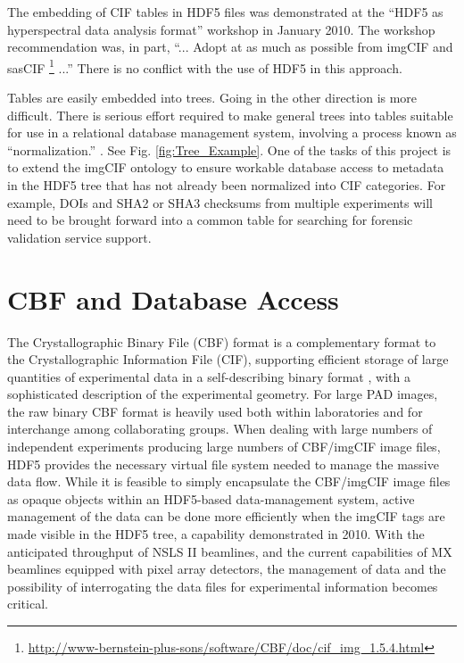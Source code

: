 \documentclass[11pt]{a0poster}
\begin{document}
\begin{minipage}[]{0.29\linewidth}
The embedding of CIF tables in HDF5
files was demonstrated at the  
``HDF5 as hyperspectral data analysis format'' workshop in January 2010. \cite{Gotz2010}  The
workshop recommendation was, in part, ``... Adopt at as much as possible from imgCIF and sasCIF
 \footnote{ \url{http://www-bernstein-plus-sons/software/CBF/doc/cif_img_1.5.4.html}} ...''   There is
 no conflict with the use of HDF5 in this approach.  

\noindent{}Tables are easily embedded into trees.  Going in
the other direction is more difficult.  There
is serious effort required to make general trees into tables suitable for use in a relational
database management system, involving a process known as ``normalization.''  \cite{Codd1972}.
See Fig. \ref{fig:Tree_Example}.
One of the tasks of this project is to extend the imgCIF ontology to ensure workable database
access to metadata in the HDF5 tree that has not already been normalized into CIF categories.
For example, DOIs and SHA2 or SHA3 checksums from multiple experiments will need to be brought
forward into a common table for searching for forensic validation service support.

\section*{CBF and Database Access}%
\fontsize{18}{22}\selectfont %
\noindent{}The Crystallographic Binary File (CBF) format is a complementary format to the Crystallographic 
Information File (CIF), supporting efficient storage of large quantities of experimental data in a 
self-describing binary format \cite{imgCIF}, with a sophisticated
description of the experimental geometry.  For large PAD images, the raw binary CBF format is heavily used both within laboratories and for interchange among collaborating groups.  When dealing with large numbers
of independent experiments producing large numbers of CBF/imgCIF image files, HDF5 provides
the necessary virtual file system needed to manage the massive data flow.  While it is feasible
to simply encapsulate the CBF/imgCIF image files as opaque objects within an HDF5-based
data-management system, active management of the data can be done more efficiently when the
imgCIF tags are made visible in the HDF5 tree, a capability demonstrated in 2010. 
With the anticipated throughput of NSLS II beamlines, and the current
capabilities of MX beamlines equipped with pixel array detectors, the
management of data and the possibility of interrogating the data files
for experimental information becomes critical.



\end{minipage}
\end{document}
